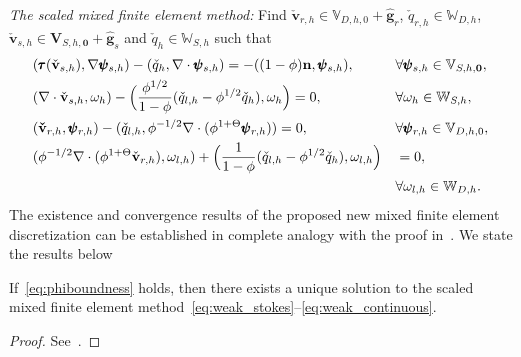 \textit{The scaled mixed finite element method:} Find $\check{\mathbf{v}}_{r,h} \in \mathbb{V}_{D,h,0} + \hat{\mathbf{g}}_r$, $\check{q}_{r,h} \in \mathbb{W}_{D,h}$, 
$\check{\mathbf{v}}_{s,h} \in \mathbf{V}_{S,h,\mathbf{0}} + \hat{\mathbf{g}}_s$ and $\check{q}_h \in \mathbb{W}_{S,h}$ such that
\begin{alignat}{2}
		  \label{eq:weak_stokes}
		  &(\pmb{\tau}(\check{\bold{v}}_{s,h}),\nabla \pmb{\psi}_{s,h}) - (\check{q}_h, \nabla \cdot \pmb{\psi}_{s,h}) = -((1-\phi)\bold{n}, \pmb{\psi}_{s,h}), &&\forall\pmb{\psi}_{s,h} \in \mathbb{V}_{S,h,\mathbf{0}},\\
		  \label{eq:weak_compaction}
		  &(\nabla \cdot \check{\bold{v}}_{s,h}, \omega_h)  - \Big(\frac{\phi^{1/2}}{1-\phi} (\check{q}_{l,h} - \phi^{1/2}\check{q}_h), \omega_h \Big) = 0, &&\forall \omega_h \in \mathbb{W}_{S,h},\\
					\label{eq:weak_darcy}
					 &(\bold{\check{v}}_{r,h},\pmb{\psi}_{r,h})  - (\check{q}_{l,h},\phi^{-1/2} \nabla \cdot (\phi^{1+\Theta}\pmb{\psi}_{r,h})) = 0, &&\forall \pmb{\psi}_{r,h} \in \mathbb{V}_{D,h,0},\\
					 \nonumber
					 &(\phi^{-1/2} \nabla \cdot (\phi^{1+\Theta}\check{\bold{v}}_{r,h}),\omega_{l,h}) + \Big(\frac{1}{1-\phi}(\check{q}_{l,h} - \phi^{1/2}\check{q}_h),\omega_{l,h} \Big) &&= 0, \\
					 \label{eq:weak_continuous}
		  &					 &&\forall \omega_{l,h} \in 
		  \mathbb{W}_{D,h}.
\end{alignat}
The existence and convergence results of the proposed new mixed finite element discretization can be established
in complete analogy with the proof in~\cite{DegenerateDarcy}. We state the results below %
\begin{lem}
If~\eqref{eq:phiboundness} holds, then there exists a unique solution to the scaled mixed finite element 
method~\eqref{eq:weak_stokes}--\eqref{eq:weak_continuous}.
\end{lem}
\begin{proof}
See~\cite{DegenerateDarcy}.
\end{proof}
